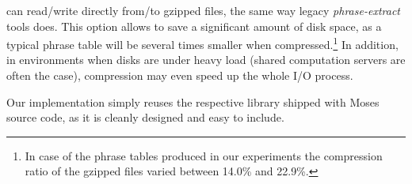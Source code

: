 \Eppex{} can read/write directly from/to gzipped files, the same way legacy \emph{phrase-extract}
tools does.
This option allows to save a significant amount of disk space, as a typical phrase table will be
several times smaller when compressed.\footnote{In case of the phrase tables produced in our experiments
the compression ratio of the gzipped files varied between 14.0\% and 22.9\%.}
In addition, in environments when disks are under heavy load (shared computation servers are often
the case), compression may even speed up the whole I/O process.

Our implementation simply reuses the respective library shipped with Moses source code,
as it is cleanly designed and easy to include.

